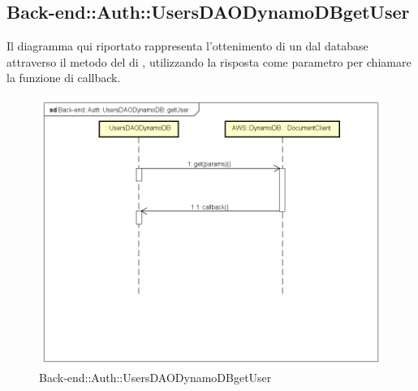 \subsection{Back-end::Auth::UsersDAODynamoDBgetUser}
Il diagramma qui riportato rappresenta l'ottenimento di un  dal database attraverso il metodo  del  di , utilizzando la risposta come parametro per chiamare la funzione di callback.
\begin{figure}[h] \centering \includegraphics[width=\textwidth,height=\textheight,keepaspectratio]{images/diagrams/back-end/Ufficial_Backend/Back-endAuthUsersDAODynamoDBgetUser.png} 	\caption{Back-end::Auth::UsersDAODynamoDBgetUser}
\end{figure} 
\newpage
